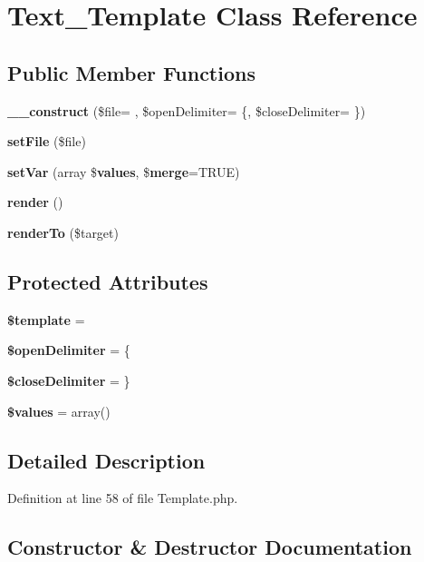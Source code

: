 \section{Text\+\_\+\+Template Class Reference}
\label{class_text___template}
\subsection*{Public Member Functions}
\begin{DoxyCompactItemize}
\item 
{\bf \+\_\+\+\_\+construct} (\$file= \textquotesingle{}\textquotesingle{}, \$open\+Delimiter= \textquotesingle{}\{\textquotesingle{}, \$close\+Delimiter= \textquotesingle{}\}\textquotesingle{})
\item 
{\bf set\+File} (\$file)
\item 
{\bf set\+Var} (array \${\bf values}, \${\bf merge}=T\+R\+U\+E)
\item 
{\bf render} ()
\item 
{\bf render\+To} (\$target)
\end{DoxyCompactItemize}
\subsection*{Protected Attributes}
\begin{DoxyCompactItemize}
\item 
{\bf \$template} = \textquotesingle{}\textquotesingle{}
\item 
{\bf \$open\+Delimiter} = \textquotesingle{}\{\textquotesingle{}
\item 
{\bf \$close\+Delimiter} = \textquotesingle{}\}\textquotesingle{}
\item 
{\bf \$values} = array()
\end{DoxyCompactItemize}


\subsection{Detailed Description}


Definition at line 58 of file Template.\+php.



\subsection{Constructor \& Destructor Documentation}
